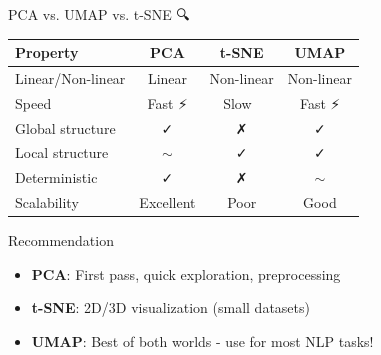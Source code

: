 \documentclass[aspectratio=169]{beamer}
\begin{document}
\begin{frame}{PCA vs. UMAP vs. t-SNE 🔍}
\begin{center}
\begin{tabular}{lccc}
\toprule
\textbf{Property} & \textbf{PCA} & \textbf{t-SNE} & \textbf{UMAP} \\
\midrule
Linear/Non-linear & Linear & Non-linear & Non-linear \\
Speed & Fast ⚡ & Slow 🐌 & Fast ⚡ \\
Global structure & ✓ & ✗ & ✓ \\
Local structure & $\sim$ & ✓ & ✓ \\
Deterministic & ✓ & ✗ & $\sim$ \\
Scalability & Excellent & Poor & Good \\
\bottomrule
\end{tabular}
\end{center}

\vspace{1em}

\begin{block}{Recommendation}
\begin{itemize}\setlength{\itemsep}{0pt}
    \item \textbf{PCA}: First pass, quick exploration, preprocessing
    \item \textbf{t-SNE}: 2D/3D visualization (small datasets)
    \item \textbf{UMAP}: Best of both worlds - use for most NLP tasks!
\end{itemize}
\end{block}
\end{frame}
\end{document}
